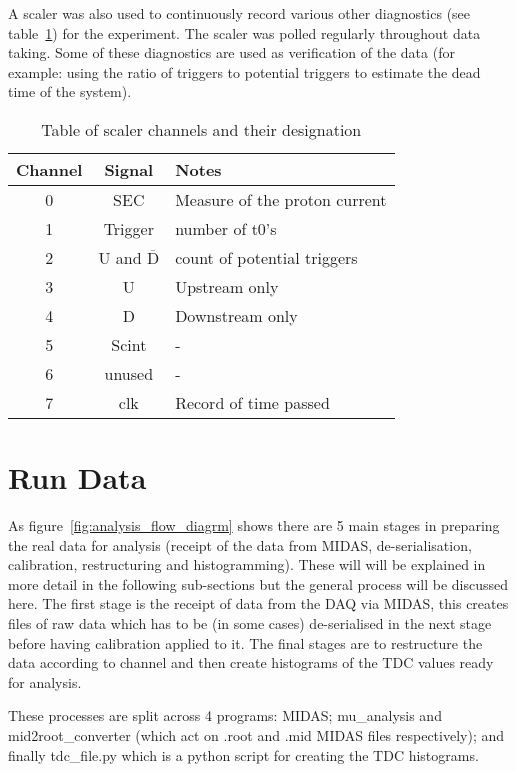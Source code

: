 \documentclass[]{article}
\begin{document}
A scaler was also used to continuously record various other diagnostics (see table~\ref{tab:scaler_chs}) for the experiment. The scaler was polled regularly throughout data taking. Some of these diagnostics are used as verification of the data (for example: using the ratio of triggers to potential triggers to estimate the dead time of the system).
\begin{table}
	\centering
	\begin{tabular}{c|c|l}
		Channel & Signal & Notes\\
		\hline
		0 & SEC & Measure of the proton current\\
		1 & Trigger & number of t0's\\
		2 & U and $\overline{\text{D}}$ & count of potential triggers\\
		3 & U & Upstream only\\
		4 & D & Downstream only\\
		5 & Scint & -\\
		6 & unused & -\\
		7 & clk & Record of time passed\\
	\end{tabular}
	\caption{Table of scaler channels and their designation}
	\label{tab:scaler_chs}
\end{table}

\section{Run Data} %
\label{sec:run_data}
As figure~\ref{fig:analysis_flow_diagrm} shows there are 5 main stages in preparing the real data for analysis (receipt of the data from MIDAS, de-serialisation, calibration, restructuring and histogramming). These will will be explained in more detail in the following sub-sections but the general process will be discussed here. The first stage is the receipt of data from the DAQ via MIDAS, this creates files of raw data which has to be (in some cases) de-serialised in the next stage before having calibration applied to it. The final stages are to restructure the data according to channel and then create histograms of the TDC values ready for analysis. 

These processes are split across 4 programs: MIDAS; mu\_analysis and mid2root\_converter (which act on .root and .mid MIDAS files respectively); and finally tdc\_file.py which is a python script for creating the TDC histograms.
\end{document}
